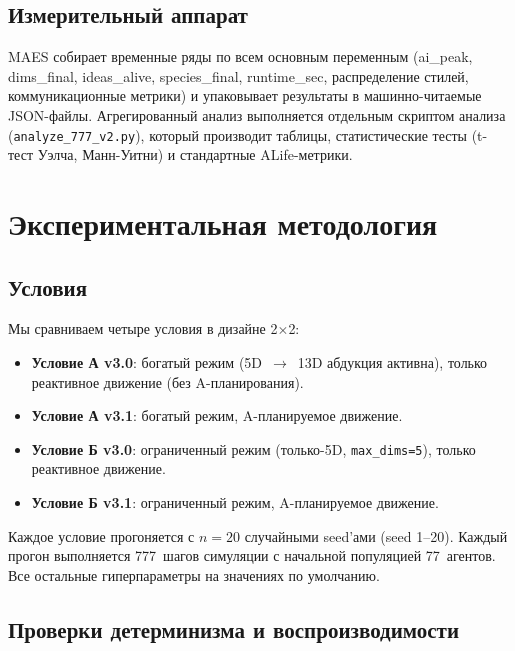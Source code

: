\documentclass[11pt,a4paper]{article}
\begin{document}
\subsection{Измерительный аппарат}

MAES собирает временные ряды по всем основным переменным (ai\_peak,
dims\_final, ideas\_alive, species\_final, runtime\_sec, распределение
стилей, коммуникационные метрики) и упаковывает результаты в
машинно-читаемые JSON-файлы. Агрегированный анализ выполняется
отдельным скриптом анализа (\texttt{analyze\_777\_v2.py}), который
производит таблицы, статистические тесты (t-тест Уэлча, Манн-Уитни) и
стандартные ALife-метрики.

\section{Экспериментальная методология}
\label{sec:method}

\subsection{Условия}

Мы сравниваем четыре условия в дизайне 2$\times$2:

\begin{itemize}
\item \textbf{Условие А v3.0}: богатый режим (5D~$\rightarrow$~13D
      абдукция активна), только реактивное движение (без A\*-планирования).
\item \textbf{Условие А v3.1}: богатый режим, A\*-планируемое движение.
\item \textbf{Условие Б v3.0}: ограниченный режим (только-5D,
      \texttt{max\_dims=5}), только реактивное движение.
\item \textbf{Условие Б v3.1}: ограниченный режим, A\*-планируемое
      движение.
\end{itemize}

Каждое условие прогоняется с $n=20$ случайными seed'ами (seed 1--20).
Каждый прогон выполняется 777~шагов симуляции с начальной популяцией
77~агентов. Все остальные гиперпараметры на значениях по умолчанию.

\subsection{Проверки детерминизма и воспроизводимости}
\end{document}
